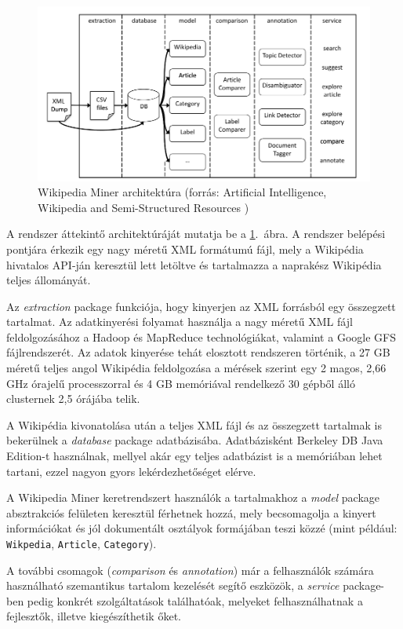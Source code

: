 \begin{figure}[htp]
\centering
\includegraphics[scale=0.4]{img/wikipediaminer}
\caption{Wikipedia Miner architektúra (forrás: Artificial Intelligence, Wikipedia and Semi-Structured Resources \cite{aijournal})}
\label{fig:wikipediaminer}
\end{figure}

A rendszer áttekintő architektúráját mutatja be a \ref{fig:wikipediaminer}.~ábra. A rendszer belépési pontjára érkezik egy nagy méretű XML formátumú fájl, mely a Wikipédia hivatalos API-ján keresztül lett letöltve és tartalmazza a naprakész Wikipédia teljes állományát.

Az \textit{extraction} package funkciója, hogy kinyerjen az XML forrásból egy összegzett tartalmat. Az adatkinyerési folyamat használja a nagy méretű XML fájl feldolgozásához a Hadoop és MapReduce technológiákat, valamint a Google GFS fájlrendszerét. Az adatok kinyerése tehát elosztott rendszeren történik, a 27 GB méretű teljes angol Wikipédia feldolgozása a mérések szerint egy 2 magos, 2,66 GHz órajelű processzorral és 4 GB memóriával rendelkező 30 gépből álló clusternek 2,5 órájába telik.

A Wikipédia kivonatolása után a teljes XML fájl és az összegzett tartalmak is bekerülnek a \textit{database} package adatbázisába. Adatbázisként Berkeley DB Java Edition-t használnak, mellyel akár egy teljes adatbázist is a memóriában lehet tartani, ezzel nagyon gyors lekérdezhetőséget elérve.

A Wikipedia Miner keretrendszert használók a tartalmakhoz a \textit{model} package absztrakciós felületen keresztül férhetnek hozzá, mely becsomagolja a kinyert információkat és jól dokumentált osztályok formájában teszi közzé (mint például: \texttt{Wikpedia}, \texttt{Article}, \texttt{Category}).

A további csomagok (\textit{comparison} és \textit{annotation}) már a felhasználók számára használható szemantikus tartalom kezelését segítő eszközök, a \textit{service} package-ben pedig konkrét szolgáltatások találhatóak, melyeket felhasználhatnak a fejlesztők, illetve kiegészíthetik őket.

